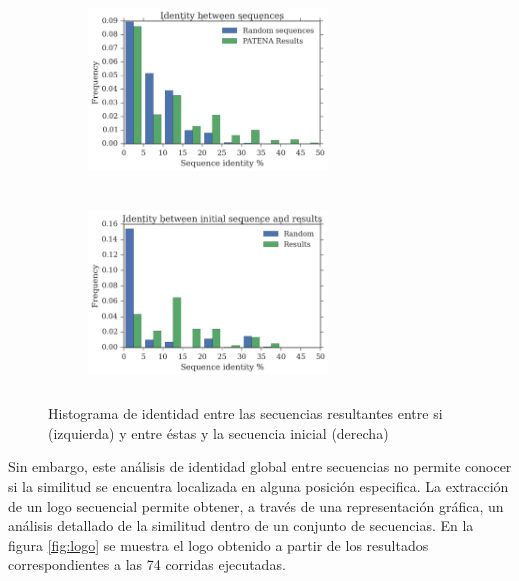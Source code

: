 \begin{figure}[htbp]
  \begin{subfigure}[b]{200px}
    \includegraphics[width=240px,height=185px]{img/resultados/againstAll-random.png}
    \label{fig:identity-a}
    \end{subfigure}
  \hspace{30px}
  \begin{subfigure}[b]{200px}
  \includegraphics[width=240px,height=185px]{img/resultados/againstInitial-random.png}
    \label{fig:identity-b}
  \end{subfigure}
  \caption{Histograma de identidad entre las secuencias resultantes entre si (izquierda) y entre éstas y la secuencia inicial (derecha)}
  \label{fig:identity}
  
\end{figure}




Sin embargo, este análisis de identidad global entre secuencias no permite conocer si la similitud se encuentra localizada en alguna posición especifica.
La extracción de un logo secuencial \cite{schneider1990sequence} permite obtener, a través de una representación gráfica, un análisis detallado de la similitud dentro de un conjunto de secuencias.
En la figura \ref{fig:logo} se muestra el logo obtenido a partir de los resultados correspondientes a las 74 corridas ejecutadas.

